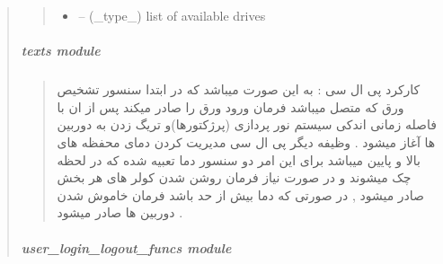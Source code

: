 \documentclass[letterpaper,10pt,english]{sphinxmanual}
\begin{document}
\begin{quote}
\begin{savenotes}
\begin{fulllineitems}
\begin{quote}
\begin{description}
\begin{itemize}
\item {} 
\sphinxAtStartPar
{} – (\_type\_) list of available drives

\end{itemize}

\end{description}\end{quote}

\end{fulllineitems}\end{savenotes}


\sphinxstepscope


\subparagraph{texts module}
\label{\detokenize{setting/backend/texts:texts-module}}\label{\detokenize{setting/backend/texts::doc}}\begin{quote}\begin{farsi}

\sphinxAtStartPar
کارکرد پی ال سی : به این صورت میباشد که در ابتدا سنسور تشخیص ورق که متصل میباشد فرمان ورود ورق را صادر میکند پس از ان با فاصله زمانی اندکی سیستم نور پردازی (پرژکتورها)و تریگ زدن به دوربین ها آغاز میشود . وظیفه دیگر پی ال سی مدیریت کردن دمای محفظه های بالا و پایین میباشد برای این امر دو سنسور دما تعبیه شده که در لحظه چک میشوند و در صورت نیاز فرمان روشن شدن کولر های هر بخش صادر میشود , در صورتی که دما بیش از حد باشد فرمان خاموش شدن دوربین ها صادر میشود .
\end{farsi}\end{quote}

\sphinxstepscope


\subparagraph{user\_login\_logout\_funcs module}
\label{\detokenize{setting/backend/user_login_logout_funcs:module-oxin.backend.user_login_logout_funcs}}\label{\detokenize{setting/backend/user_login_logout_funcs:user-login-logout-funcs-module}}\label{\detokenize{setting/backend/user_login_logout_funcs::doc}}


\end{quote}
\end{document}
